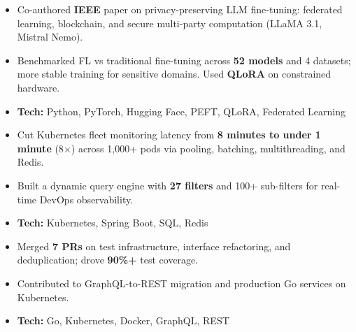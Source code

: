 \documentclass[10pt,a4paper,ragged2e]{altacv}
\begin{document}
\begin{itemize}[leftmargin=*]
    \item Co-authored \textbf{IEEE} paper on privacy-preserving LLM fine-tuning: federated learning, blockchain, and secure multi-party computation (LLaMA 3.1, Mistral Nemo).
    \item Benchmarked FL vs traditional fine-tuning across \textbf{52 models} and 4 datasets; more stable training for sensitive domains. Used \textbf{QLoRA} on constrained hardware.
    \item \textbf{Tech:} Python, PyTorch, Hugging Face, PEFT, QLoRA, Federated Learning
\end{itemize}
\vspace{-0.5em}
\divider
\vspace{-0.35em}

\begin{itemize}[leftmargin=*]
    \item Cut Kubernetes fleet monitoring latency from \textbf{8 minutes to under 1 minute} (8$\times$) across 1,000+ pods via pooling, batching, multithreading, and Redis.
    \item Built a dynamic query engine with \textbf{27 filters} and 100+ sub-filters for real-time DevOps observability.
    \item \textbf{Tech:} Kubernetes, Spring Boot, SQL, Redis
\end{itemize}
\vspace{-0.5em}
\divider
\vspace{-0.35em}

\begin{itemize}[leftmargin=*]
    \item Merged \textbf{7 PRs} on test infrastructure, interface refactoring, and deduplication; drove \textbf{90\%+} test coverage.
    \item Contributed to GraphQL-to-REST migration and production Go services on Kubernetes.
    \item \textbf{Tech:} Go, Kubernetes, Docker, GraphQL, REST
\end{itemize}

\end{document}
